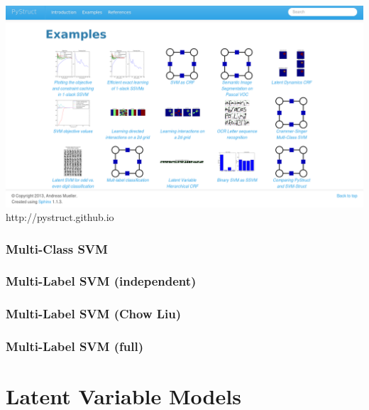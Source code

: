 \documentclass[final,ignorenonframetext,compress]{beamer}
\begin{document}
    \begin{frame}
        \begin{center}
            \includegraphics[width=\linewidth]{images/example_gallery}\\
            http://pystruct.github.io
        \end{center}
    \end{frame}

\begin{frame}
    \frametitle{Multi-Class SVM}
\end{frame}

\begin{frame}
    \frametitle{Multi-Label SVM (independent)}
\end{frame}

\begin{frame}
    \frametitle{Multi-Label SVM (Chow Liu)}
\end{frame}

\begin{frame}
    \frametitle{Multi-Label SVM (full)}
\end{frame}

\section{Latent Variable Models}


\end{document}
